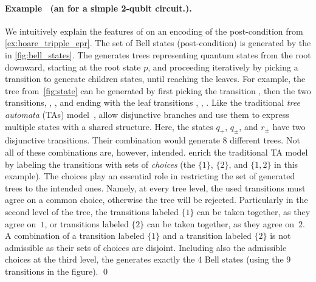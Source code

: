 


\EPRSpec

\figNGHZpost
{}
\setcounter{cexBell}{\value{example}}
\paragraph{Example \theexample\ (an \lsta for a simple 2-qubit circuit.).}
We intuitively explain the features of \lstas on an encoding of the post-condition from \cref{ex:hoare_tripple_epr}.
The set of Bell states (post-condition) is generated by the \lsta in \cref{fig:bell_states}. The \lsta 
generates trees representing quantum states from the root downward, starting at the root state $p$, and proceeding iteratively by picking a transition to generate children states, until reaching the leaves.
For example, the tree from~\cref{fig:state} can be generated by first picking the transition , then the two transitions, 
, , and ending with the leaf transitions , , . 
Like the traditional \emph{tree automata} (TAs) model~\cite{tata}, \lstas allow disjunctive branches and use them to express multiple states with a shared structure.
Here, the states $q_+$, $q_\pm$, and $r_\pm$ have two disjunctive transitions.
Their combination would generate 8 different trees.
Not all of these combinations are, however, intended.
\lstas enrich the traditional TA model by labeling the transitions with sets of \emph{choices} (the
$\{1\}$, $\{2\}$, and $\{1,2\}$ in this example).
The choices play an essential role in restricting the set of generated trees to the intended ones. 
Namely, at every tree level, the used transitions must agree on a common choice,
otherwise the tree will be rejected. 
Particularly in the second level of the tree, the transitions labeled $\{1\}$
can be taken together, as they agree on~$1$, or transitions labeled $\{2\}$
can be taken together, as they agree on~$2$. A combination of a transition labeled $\{1\}$
and a transition labeled $\{2\}$ is not admissible as their sets of choices are
disjoint.  
Including also the admissible choices at the third level, the \lsta generates exactly the 4 Bell states (using the 9 transitions in the figure). 
\qed



